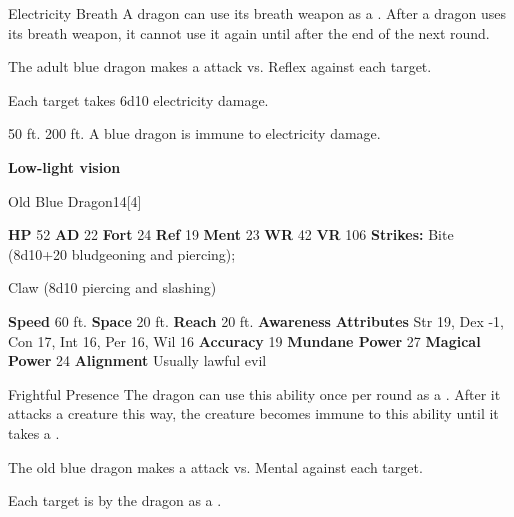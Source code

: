    \begin{freeability}{Electricity Breath}
      A dragon can use its breath weapon as a .
      After a dragon uses its breath weapon, it cannot use it again until after the end of the next round.
      \par The adult blue dragon makes a  attack
        vs. Reflex against each target.
    
    \hit Each target takes 6d10 electricity damage.
    \end{freeability}
  
      
       50 ft.
     200 ft.
     A blue dragon is immune to electricity damage.
    \par\noindent\textbf{Low-light vision}
  

  \begin{monsubsection}{Old Blue Dragon}{14}[4]
    \vspace{-1em}\vspace{-1em}
    \vspace{0em}

    
    

    \begin{spellcontent}
      \begin{spelltargetinginfo}
        \pari \textbf{HP} 52 \monsep
          \textbf{AD} 22 \monsep
          \textbf{Fort} 24 \monsep
          \textbf{Ref} 19 \monsep
          \textbf{Ment} 23
        \pari \textbf{WR} 42 \monsep
        \textbf{VR} 106
        \pari \textbf{Strikes:}
            Bite  (8d10+20 bludgeoning and piercing);
\par Claw  (8d10 piercing and slashing)
      \end{spelltargetinginfo}
    \end{spellcontent}
    \begin{monsterfooter}
      \pari \textbf{Speed} 60 ft. \monsep
        \textbf{Space} 20 ft. \monsep
        \textbf{Reach} 20 ft.
      \pari \textbf{Awareness} 
      \pari \textbf{Attributes}
        Str 19, Dex -1,
        Con 17, Int 16,
        Per 16, Wil 16
      \pari \textbf{Accuracy} 19 \monsep
        \textbf{Mundane Power} 27 \monsep
      \textbf{Magical Power} 24
      \pari \textbf{Alignment} Usually lawful evil
    \end{monsterfooter}
  \end{monsubsection}
  \begin{freeability}{Frightful Presence}
      The dragon can use this ability once per round as a .
      After it attacks a creature this way, the creature becomes immune to this ability until it takes a .
      \par The old blue dragon makes a  attack
        vs. Mental against each target.
    
    \hit Each target is  by the dragon as a .
    \end{freeability}
  

